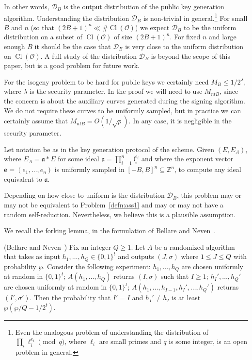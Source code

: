 \documentclass{llncs}
\newcommand{\D}{\mathcal{D}}
\newcommand{\OO}{\mathcal{O}}
\newcommand{\Z}{\mathbb{Z}}
\DeclareMathOperator{\Cl}{Cl}
\renewcommand{\a}{\mathfrak{a}}
\renewcommand{\l}{\mathfrak{l}}
\newcommand{\e}{\mathbf{e}}
\begin{document}
In other words, $\D_B$ is the output distribution of the public key generation algorithm.
Understanding the distribution $\D_B$ is non-trivial in general.\footnote{Even the analogous problem of understanding the distribution of $\prod_i \ell_i^{e_i} \pmod{q}$, where $\ell_i$ are small primes and $q$ is some integer, is an open problem in general.}
For small $B$ and $n$ (so that $(2B+1)^n \ll \#\Cl(\OO)$) we expect $\D_B$ to be the uniform distribution on a subset of $\Cl(\OO)$ of size $(2B+1)^n$. For fixed $n$ and large enough $B$ it should be the case that $\D_B$ is very close to the uniform distribution on $\Cl(\OO)$.
A full study of the distribution $\D_B$ is beyond the scope of this paper, but is a good problem for future work.

For the isogeny problem to be hard for public keys we certainly need $M_B \le 1/2^\lambda$, where $\lambda$ is the security parameter.
In the proof we will need to use $M_{ntB}$, since the concern is about the auxiliary curves generated during the signing algorithm. We do not require these curves to be uniformly sampled, but in practice we can certainly assume that $M_{ntB} = O( 1/\sqrt{p} )$. In any case, it is negligible in the security parameter.



\begin{problem} \label{defn:ass1p}
Let notation be as in the key generation protocol of the scheme.
Given $(E, E_A)$, where $E_A = \a * E$ for some ideal $\a = \prod_{i=1}^n \l_i^{e_i}$ and where the exponent vector $\e = (e_1, \dots, e_n)$ is uniformly sampled in $[-B,B]^n \subseteq \Z^n$, to compute any ideal equivalent to $\a$.
\end{problem}

Depending on how close to uniform is the distribution $\D_B$, this problem may or may not be equivalent to Problem~\ref{defn:ass1} and may or may not have a random self-reduction.
Nevertheless, we believe this is a plausible assumption.


We recall the forking lemma, in the formulation of Bellare and Neven~\cite{BN06}.

\begin{lemma} \label{forking-lemma} (Bellare and Neven~\cite{BN06})
Fix an integer $Q \ge 1$. Let $A$ be a randomized algorithm that takes as input $h_1, \dots, h_Q \in \{0,1\}^t$ and outputs $(J, \sigma)$ where $ 1\le J \le Q$ with probability $\wp$.
Consider the following experiment: $h_1, \dots, h_Q$ are chosen uniformly at random in $\{0,1\}^t$; $A(h_1, \dots, h_Q )$ returns $(I,\sigma)$ such that $I \ge 1$; $h_I', \dots, h_Q'$ are chosen uniformly at random in $\{0,1\}^t$; $A( h_1, \dots, h_{I-1}, h_I', \dots, h_Q' )$ returns $(I', \sigma')$.
Then the probability that $I' = I$ and $h_{I}' \ne h_I$ is at least $\wp( \wp/Q - 1/2^t )$.
\end{lemma}
\end{document}
